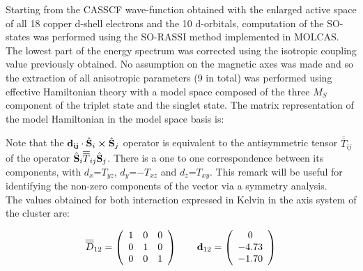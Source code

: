 \documentclass[12pt,a4paper]{report}
\numberwithin{equation}{section}
\begin{document}
Starting from the CASSCF wave-function obtained with the enlarged active space of all 18 copper d-shell electrons and the 10 d-orbitals, computation of the SO-states was performed using the SO-RASSI method implemented in MOLCAS.
The lowest part of the energy spectrum was corrected using the isotropic coupling value previously obtained.
No assumption on the magnetic axes was made and so the extraction of all anisotropic parameters (9 in total) was performed using effective Hamiltonian theory with a model space composed of the three $M_S$ component of the triplet state and the singlet state.
The matrix representation of the model Hamiltonian in the model space basis is:
\begin{center}
    \centering
\end{center}
Note that the $\vb{d_{ij}} \cdot \hat{\vb{S}}_i \cross \hat{\vb{S}}_j$ operator is equivalent to the antisymmetric tensor $\overline{\overline{T}}_{ij}$ of the operator $\hat{\vb{S}}_i \overline{\overline{T}}_{ij} \hat{\vb{S}}_j$.
There is a one to one correspondence between its components, with $d_x$=$T_{yz}$, $d_y$=$-T_{xz}$ and $d_z$=$T_{xy}$.
This remark will be useful for identifying the non-zero components of the vector via a symmetry analysis.\\
The values obtained for both interaction expressed in Kelvin in the axis system of the cluster are:

\[ \overline{\overline{D}}_{12}= \left( \begin{array}{c c c}
    1 & 0 & 0\\
    0 & 1 & 0\\
    0 & 0 & 1
    \end{array} \right)
    \qquad
    \vb{d}_{12}=
    \left( \begin{array}{c}
    0  \\
    -4.73  \\
    -1.70
    \end{array} \right)
    \]
    
\end{document}
